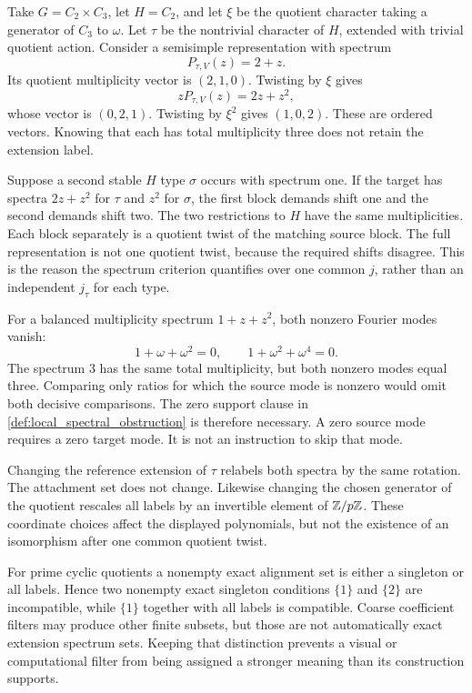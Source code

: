 Take \(G=C_2\times C_3\), let \(H=C_2\), and let \(\xi\) be the quotient character taking a generator of \(C_3\) to \(\omega\). Let \(\tau\) be the nontrivial character of \(H\), extended with trivial quotient action. Consider a semisimple representation with spectrum
\[
 P_{\tau,V}(z)=2+z.
\]
Its quotient multiplicity vector is \((2,1,0)\). Twisting by \(\xi\) gives
\[
 zP_{\tau,V}(z)=2z+z^2,
\]
whose vector is \((0,2,1)\). Twisting by \(\xi^2\) gives \((1,0,2)\). These are ordered vectors. Knowing that each has total multiplicity three does not retain the extension label.

Suppose a second stable \(H\) type \(\sigma\) occurs with spectrum one. If the target has spectra \(2z+z^2\) for \(\tau\) and \(z^2\) for \(\sigma\), the first block demands shift one and the second demands shift two. The two restrictions to \(H\) have the same multiplicities. Each block separately is a quotient twist of the matching source block. The full representation is not one quotient twist, because the required shifts disagree. This is the reason the spectrum criterion quantifies over one common \(j\), rather than an independent \(j_\tau\) for each type.

For a balanced multiplicity spectrum \(1+z+z^2\), both nonzero Fourier modes vanish:
\[
 1+\omega+\omega^2=0,\qquad
 1+\omega^2+\omega^4=0.
\]
The spectrum \(3\) has the same total multiplicity, but both nonzero modes equal three. Comparing only ratios for which the source mode is nonzero would omit both decisive comparisons. The zero support clause in \cref{def:local_spectral_obstruction} is therefore necessary. A zero source mode requires a zero target mode. It is not an instruction to skip that mode.

Changing the reference extension of \(\tau\) relabels both spectra by the same rotation. The attachment set does not change. Likewise changing the chosen generator of the quotient rescales all labels by an invertible element of \(\mathbb Z/p\mathbb Z\). These coordinate choices affect the displayed polynomials, but not the existence of an isomorphism after one common quotient twist.

For prime cyclic quotients a nonempty exact alignment set is either a singleton or all labels. Hence two nonempty exact singleton conditions \(\{1\}\) and \(\{2\}\) are incompatible, while \(\{1\}\) together with all labels is compatible. Coarse coefficient filters may produce other finite subsets, but those are not automatically exact extension spectrum sets. Keeping that distinction prevents a visual or computational filter from being assigned a stronger meaning than its construction supports.

